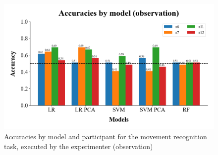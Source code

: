 \documentclass[10pt,conference,compsocconf]{IEEEtran}
\begin{document}
\begin{figure}[h!]
    \center
    \includegraphics[width=\linewidth]{../Code/figures/accuracies_across_part_obs.png}
    \caption{Accuracies by model and participant for the movement recognition task, executed by the experimenter (observation)}
\end{figure}
\FloatBarrier



\end{document}

